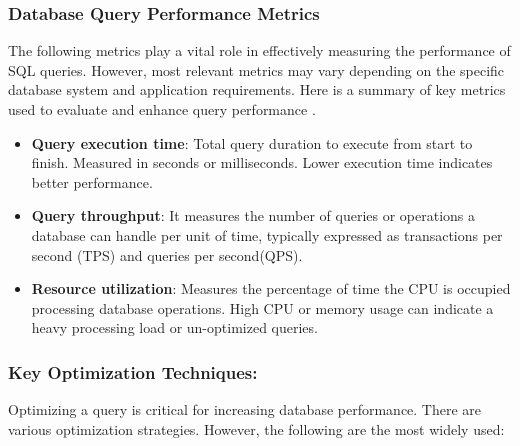 \subsubsection{Database Query Performance Metrics}
The following metrics play a vital role in effectively measuring the performance of SQL queries. However, most relevant metrics may vary depending on the specific database system and application requirements.
Here is a summary of key metrics used to evaluate and enhance query performance \cite{chwesewicz-2024}.
\begin{itemize}
    \item\textbf{Query execution time}: Total query duration to execute from start to finish. Measured in seconds or milliseconds. Lower execution time indicates better performance.
    \item\textbf{Query throughput}: It measures the number of queries or operations a database can handle per unit of time, typically expressed as transactions per second (TPS) and queries per second(QPS).
    \item\textbf{Resource utilization}: Measures the percentage of time the CPU is occupied processing database operations. High CPU or memory usage can indicate a heavy processing load or un-optimized queries.
\end{itemize}

\subsubsection{Key Optimization Techniques:}

Optimizing a query is critical for increasing database performance. There are various optimization strategies. However, the following are the most widely used:

